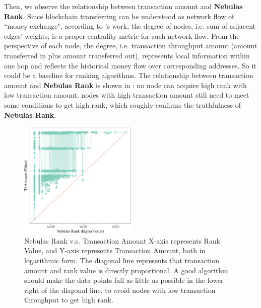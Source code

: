 Then, we observe the relationship between transaction amount and \textbf{Nebulas Rank}. Since blockchain transferring can be understood as network flow of ``money exchange", according to \textcite{Borgatti2005}'s work, the degree of nodes, i.e. sum of adjacent edges' weights, is a proper centrality metric for such network flow. From the perspective of each node, the degree, i.e. transaction throughput amount (amount transferred in plus amount transferred out), represents local information within one hop and reflects the historical money flow over corresponding addresses. So it could be a baseline for ranking algorithms. The relationship between transaction amount and \textbf{Nebulas Rank} is shown in : no node can acquire high rank with low transaction amount; nodes with high transaction amount still need to meet some conditions to get high rank, which roughly confirms the truthfulness of \textbf{Nebulas Rank}.
\begin{figure}[!htbp]
	\centering
	\includegraphics[width=0.50\textwidth]{figs/MAY_lr.png}
	\caption{Nebulas Rank v.s. Transaction Amount \small{X-axis represents Rank Value, and Y-axis represents Transaction Amount, both in logarithmic form.  The diagonal line represents that transaction amount and rank value is directly proportional. A good algorithm should make the data points fall as little as possible in the lower right of the diagonal line, to avoid nodes with low transaction throughput to get high rank.}}\label{fig:nrio}
\end{figure}

